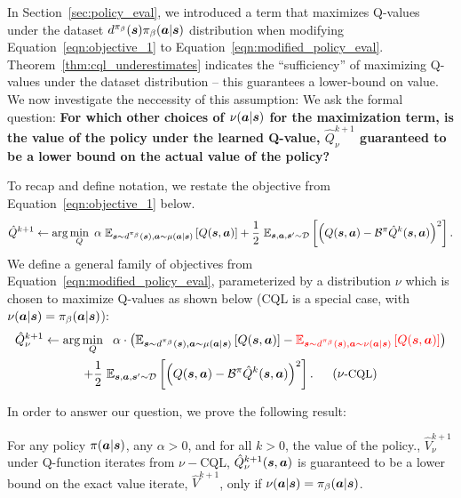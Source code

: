 In Section~\ref{sec:policy_eval}, we introduced a term that maximizes Q-values under the dataset $d^{\pi_\beta}(\boldsymbol{s}) {\pi_\beta}(\boldsymbol{a}|\boldsymbol{s})$ distribution when modifying Equation~\ref{eqn:objective_1} to Equation~\ref{eqn:modified_policy_eval}. Theorem~\ref{thm:cql_underestimates} indicates the ``sufficiency'' of maximizing Q-values under the dataset distribution -- this guarantees a lower-bound on value. We now investigate the neccessity of this assumption: We ask the formal question: \textbf{For which other choices of $\nu(\boldsymbol{a}|\boldsymbol{s})$ for the maximization term, is the value of the policy under the learned Q-value, $\hat{Q}^{k+1}_\nu$ guaranteed to be a lower bound on the actual value of the policy?}

To recap and define notation, we restate the objective from Equation~\ref{eqn:objective_1} below.  
\begin{equation}
    \small{\hat{Q}^{k+1} \leftarrow \arg\min_{Q}~ \alpha~ \mathbb{E}_{\boldsymbol{s}\sim d^{\pi_\beta}(\boldsymbol{s}), \boldsymbol{a}\sim \mu(\boldsymbol{a}|\boldsymbol{s})}\left[Q(\boldsymbol{s}, \boldsymbol{a})\right] + \frac{1}{2}~ \mathbb{E}_{\boldsymbol{s}, \boldsymbol{a}, \boldsymbol{s}' \sim \mathcal{D}}\left[\left(Q(\boldsymbol{s}, \boldsymbol{a}) - \mathcal{B}^\pi\hat{Q}^{k} (\boldsymbol{s}, \boldsymbol{a}) \right)^2 \right].} 
    \label{eqn:objective_1_restated}
\end{equation}
We define a general family of objectives from Equation~\ref{eqn:modified_policy_eval}, parameterized by a distribution $\nu$ which is chosen to maximize Q-values as shown below (CQL is a special case, with $\nu(\boldsymbol{a}|\boldsymbol{s}) = {\pi_\beta}(\boldsymbol{a}|\boldsymbol{s})$):
\begin{multline}
    \small{\hat{Q}^{k+1}_\nu \leftarrow \arg\min_{Q}~~ \alpha \cdot \left(\mathbb{E}_{\boldsymbol{s}\sim d^{\pi_\beta}(\boldsymbol{s}), \boldsymbol{a}\sim \mu(\boldsymbol{a}|\boldsymbol{s})}\left[Q(\boldsymbol{s}, \boldsymbol{a})\right] - \textcolor{red}{\mathbb{E}_{\boldsymbol{s}\sim d^{\pi_\beta}(\boldsymbol{s}), \boldsymbol{a}\sim \nu(\boldsymbol{a}|\boldsymbol{s})}\left[Q(\boldsymbol{s}, \boldsymbol{a})\right]} \right)} \\
    \small{+ \frac{1}{2}~ \mathbb{E}_{\boldsymbol{s}, \boldsymbol{a}, \boldsymbol{s}' \sim \mathcal{D}}\left[\left(Q(\boldsymbol{s}, \boldsymbol{a}) - \mathcal{B}^\pi\hat{Q}^{k} (\boldsymbol{s}, \boldsymbol{a}) \right)^2 \right].~~~~~ (\nu\text{-CQL})}
    \label{eqn:modified_policy_eval_new}
\end{multline}

In order to answer our question, we prove the following result:
\begin{theorem} For any policy $\pi(\boldsymbol{a}|\boldsymbol{s})$, any $\alpha > 0$, and for all $k > 0$, the value of the policy., $\hat{V}^{k+1}_\nu$ under Q-function iterates from $\nu-$CQL, $\hat{Q}^{k+1}_\nu(\boldsymbol{s}, \boldsymbol{a})$ is guaranteed to be a lower bound on the exact value iterate, $\hat{V}^{k+1}$, only if $\nu(\boldsymbol{a}|\boldsymbol{s}) = {\pi_\beta}(\boldsymbol{a}|\boldsymbol{s})$.   
\end{theorem}

